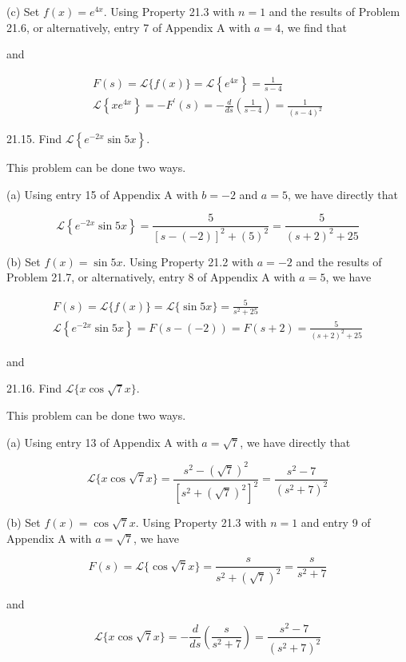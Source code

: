 \documentclass[10pt]{article}
\begin{document}
(c) Set $f(x)=e^{4 x}$. Using Property 21.3 with $n=1$ and the results of Problem 21.6, or alternatively, entry 7 of Appendix A with $a=4$, we find that

and

$$
\begin{gathered}
F(s)=\mathscr{L}\{f(x)\}=\mathscr{L}\left\{e^{4 x}\right\}=\frac{1}{s-4} \\
\mathscr{L}\left\{x e^{4 x}\right\}=-F^{\prime}(s)=-\frac{d}{d s}\left(\frac{1}{s-4}\right)=\frac{1}{(s-4)^{2}}
\end{gathered}
$$

21.15. Find $\mathscr{L}\left\{e^{-2 x} \sin 5 x\right\}$.

This problem can be done two ways.

(a) Using entry 15 of Appendix A with $b=-2$ and $a=5$, we have directly that

$$
\mathscr{L}\left\{e^{-2 x} \sin 5 x\right\}=\frac{5}{[s-(-2)]^{2}+(5)^{2}}=\frac{5}{(s+2)^{2}+25}
$$

(b) Set $f(x)=\sin 5 x$. Using Property 21.2 with $a=-2$ and the results of Problem 21.7, or alternatively, entry 8 of Appendix A with $a=5$, we have

$$
\begin{gathered}
F(s)=\mathscr{L}\{f(x)\}=\mathscr{L}\{\sin 5 x\}=\frac{5}{s^{2}+25} \\
\mathscr{L}\left\{e^{-2 x} \sin 5 x\right\}=F(s-(-2))=F(s+2)=\frac{5}{(s+2)^{2}+25}
\end{gathered}
$$

and

21.16. Find $\mathscr{L}\{x \cos \sqrt{7} x\}$.

This problem can be done two ways.

(a) Using entry 13 of Appendix A with $a=\sqrt{7}$, we have directly that

$$
\mathscr{L}\{x \cos \sqrt{7} x\}=\frac{s^{2}-(\sqrt{7})^{2}}{\left[s^{2}+(\sqrt{7})^{2}\right]^{2}}=\frac{s^{2}-7}{\left(s^{2}+7\right)^{2}}
$$

(b) Set $f(x)=\cos \sqrt{7} x$. Using Property 21.3 with $n=1$ and entry 9 of Appendix A with $a=\sqrt{7}$, we have

$$
F(s)=\mathscr{L}\{\cos \sqrt{7} x\}=\frac{s}{s^{2}+(\sqrt{7})^{2}}=\frac{s}{s^{2}+7}
$$

and

$$
\mathscr{L}\{x \cos \sqrt{7} x\}=-\frac{d}{d s}\left(\frac{s}{s^{2}+7}\right)=\frac{s^{2}-7}{\left(s^{2}+7\right)^{2}}
$$
\end{document}
